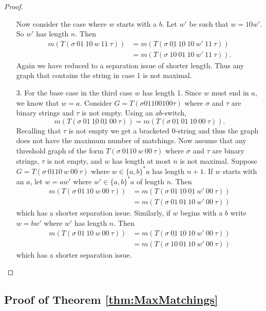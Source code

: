 \documentclass[12pt]{amsart}
\theoremstyle{plain}
\theoremstyle{definition}
\begin{document}
\begin{proof}
\begin{enumerate}
 Now consider the case where $w$ starts with a $b$.  Let $w'$ be such that $w = 10w'$.  So $w'$ has length $n$. Then 
 \begin{align*}
 m(T(\sigma~01~10~w~11~\tau))
 &=m(T(\sigma~\underline{01}~\underline{10}~10~w'~11~\tau))\\
 &= m(T(\sigma~10~ 01~10~w'~11~\tau)).
 \end{align*}
  Again we have reduced to a separation issue of shorter length. Thus any graph that contains the string in case 1 is not maximal.
  
 \item[3.]  
For the base case in the third case $w$ has length 1.  Since $w$  must end in $a$, we know that $w=a$.  Consider $G = T(\sigma 01100100\tau)$ where $\sigma$ and $\tau$ are binary strings and $\tau$ is not empty.  
Using an $ab$-switch,
$$m(T(\sigma ~01~\underline{10}~\underline{01}~00~\tau))= m(T(\sigma ~01~01~10~00~\tau)).$$
Recalling that $\tau$ is not empty we get a bracketed $0$-string and thus the graph does not have the  maximum number of matchings.  Now assume that any threshold graph of the form $ T(\sigma~0110~w~00~\tau)$ where $\sigma$ and $\tau$ are binary strings, $\tau$ is not empty, 
 and $w$ has length at most $n$ is not maximal.  Suppose $G=T(\sigma~0110~w~00~\tau)$ where $w\in\{a,b\}^*a$ has length $n+1$.  If $w$ starts with an $a$, let $w = aw'$ where $w'\in\{a,b\}^*a$ of length $n$. Then
\begin{align*}
m(T(\sigma ~01~10~w~00~\tau))&=m(T(\sigma~01~\underline{10}~\underline{01}~w'~00~\tau))\\
&=m(T(\sigma~ 01~01~10~w'~00~\tau))
\end{align*}
which has a shorter separation issue.  Similarly,  if $w$ begins with a $b$ write $w = bw'$ where $w'$ has length $n$. Then
\begin{align*}
m(T(\sigma~01~10~w~00~\tau))&=m(T(\sigma~\underline{01}~\underline{10}~10~w'~00~\tau))\\
&=m(T(\sigma~ 10~01~10~w'~00~\tau))
\end{align*}
which has a shorter separation issue.
 \end{enumerate}
\end{proof}



\subsection*{Proof of Theorem \ref{thm:MaxMatchings}}\label{proof:maxmatchings}
\end{document}

